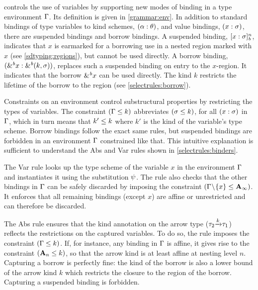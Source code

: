 \lang controls the use of variables by supporting new modes of
binding in a type environment $\Gamma$.
Its definition is given in  \cref{grammar:env}.
In addition to standard bindings of type variables to kind schemes,
$(\alpha : \theta)$,  and value bindings, $(x : \sigma)$, there
are suspended bindings and borrow bindings.
A suspended binding, $[x : \sigma]_{\textit{b}}^n$, indicates that $x$ is
earmarked for a borrowing use in a nested region
marked with $x$ (see \cref{sdtyping:regions}), but
cannot be used directly.
A borrow binding, $({\&}^{\textit{b}}x : {\&}^{\textit{b}}(k,\sigma))$, replaces
such a suspended binding on entry to the $x$-region. It indicates
that the borrow ${\&}^{\textit{b}}x$ can be used directly. The kind $k$
restricts the lifetime of the borrow to the region (see \cref{selectrules:borrow}).


Constraints on an environment control substructural properties by
restricting the types of variables.  The constraint $(\Gamma \leq k)$
abbreviates $(\sigma \leq k)$, for all $(x : \sigma)$
in $\Gamma$, which in turn means that $k' \leq k$ where $k'$ is the kind of
the variable's type scheme.
Borrow bindings follow the exact same rules, but suspended bindings
are forbidden in an environment $\Gamma$ constrained like that.
This intuitive explanation is sufficient to understand
the {\sc Abs} and {\sc Var} rules shown in
\cref{selectrules:binders}.

The {\sc Var} rule looks up the type scheme of the variable $x$ in
the environment $\Gamma$
and instantiates it using the substitution $\mathrm{\psi}$. The rule also
checks that the other bindings in $\Gamma$ can be safely discarded by
imposing the constraint $(\Gamma\!\setminus\!\{x\} \leq \mathbf{A}_\infty)$.
It enforces that all remaining bindings (except $x$) are affine or
unrestricted and can therefore be discarded.

The {\sc Abs} rule ensures that the kind annotation on the arrow type
($\tau_2 {\xrightarrow{k}} \tau_1$) reflects the restrictions on the captured variables.
To do so, the rule imposes the constraint $(\Gamma \leq k)$.
If, for instance, any binding in $\Gamma$ is affine, it gives rise to the
constraint $(\mathbf{A}_n \leq k)$, so that  the arrow kind is at least
affine at nesting level $n$.
Capturing a borrow is perfectly fine: the kind of the borrow is also a
lower bound of the arrow kind $k$ which restricts the closure
to the region of the borrow.
Capturing a suspended binding is forbidden.




